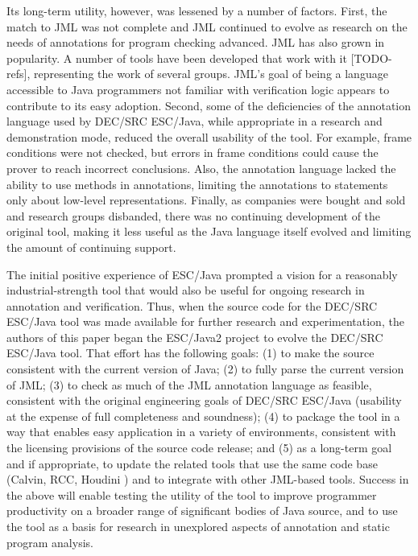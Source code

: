 \documentclass{sig-alternate}
\begin{document}
Its long-term utility, however, was lessened by a number of factors.
First, the match to JML was not complete and JML continued to evolve
as research on the needs of annotations for program checking advanced.
JML has also grown in
popularity.  A number of tools have been developed that work with it [TODO-refs],
representing the work of several groups.  JML's goal of being a language
accessible to Java programmers not familiar with verification logic appears to
contribute to its easy adoption.   
Second, some of the deficiencies of the annotation language used by
DEC/SRC ESC/Java, while appropriate in a research 
and demonstration mode, reduced the
overall usability of the tool.  For example, frame conditions were not
checked, but errors in frame conditions could cause the prover to
reach incorrect conclusions.  Also, the annotation language lacked the
ability to use methods in annotations, limiting the annotations to
statements only about low-level representations.  Finally, as
companies were bought and sold and research groups disbanded, there
was no continuing development of the original tool, making it
less useful as the Java language itself evolved and limiting the
amount of continuing support.

The initial positive experience of ESC/Java prompted a vision for a
reasonably industrial-strength tool that would also be useful for
ongoing research in annotation and verification.  Thus, when the
source code for the DEC/SRC ESC/Java tool was made available for
further research and experimentation, the authors of this paper began
the ESC/Java2 project to evolve the DEC/SRC ESC/Java tool.  That
effort has the following goals:
(1) to make the source consistent with the current version of Java;
(2) to fully parse the current version of JML;
(3) to check as much of the JML annotation language as feasible,
consistent with the original engineering goals of DEC/SRC ESC/Java
(usability at the expense of full completeness and soundness); 
(4) to package the tool in a way that enables easy application in a
variety of environments, consistent with the licensing provisions of
the source code release;
and
(5) as a long-term goal and if appropriate, to update the related
tools that use the same code base (Calvin, RCC, Houdini \cite{flanagan01houdini}) and to
integrate with other JML-based tools.  Success in the above will
enable testing the utility of the tool to improve programmer
productivity on a broader range of significant bodies of Java source,
and to use the tool as a basis for research in unexplored aspects of
annotation and static program analysis.
  
\end{document}
